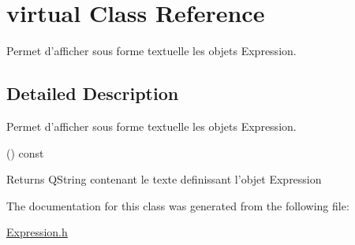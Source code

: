\hypertarget{classvirtual}{\section{virtual \-Class \-Reference}
\label{classvirtual}
}


\-Permet d'afficher sous forme textuelle les objets \-Expression.  




\subsection{\-Detailed \-Description}
\-Permet d'afficher sous forme textuelle les objets \-Expression. 

() const \begin{DoxyReturn}{\-Returns}
\-Q\-String contenant le texte definissant l'objet \-Expression 
\end{DoxyReturn}


\-The documentation for this class was generated from the following file\-:\begin{DoxyCompactItemize}
\item 
\hyperlink{_expression_8h}{\-Expression.\-h}\end{DoxyCompactItemize}
